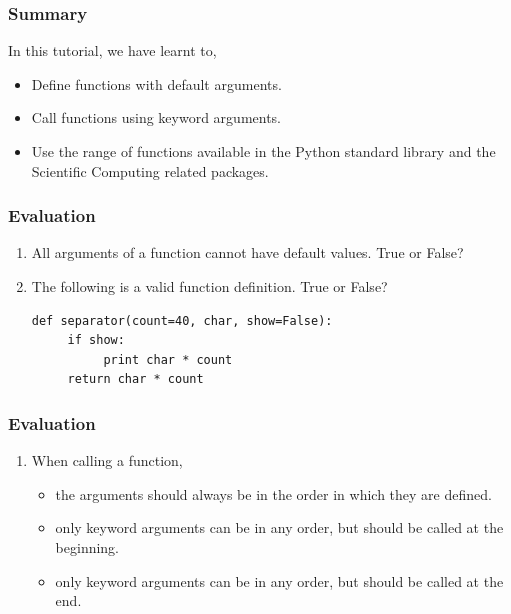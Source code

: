 \documentclass[17pt]{beamer}
\newcounter{saveenumi}
\newcommand{\seti}{\setcounter{saveenumi}{\value{enumi}}}
\newcommand{\conti}{\setcounter{enumi}{\value{saveenumi}}}
\begin{document}
\begin{frame}
\frametitle{Summary}
\label{sec-12}

 In this tutorial, we have learnt to, 

\begin{itemize}
\item Define functions with default arguments.\pause
\item Call functions using keyword arguments.\pause
\item Use the range of functions available in the Python standard library 
   and the Scientific Computing related packages.
\end{itemize}
\end{frame}

\begin{frame}[fragile]
\frametitle{Evaluation}
\label{sec-13.1}

\begin{enumerate}
\item All arguments of a function cannot have default values.
 True or False?\pause
\vspace{3pt} 
\item The following is a valid function definition. True or False? \pause
\lstset{language=Python}
\begin{footnotesize}
\begin{lstlisting}
def separator(count=40, char, show=False):
     if show:
          print char * count
     return char * count
\end{lstlisting}
\end{footnotesize}
\seti
\end{enumerate}
\end{frame}

\begin{frame}[fragile]
\frametitle{Evaluation}
\label{sec-13.2}

\begin{enumerate}
\conti
\item When calling a function,
\begin{itemize}
\item the arguments should always be in the order in which they are defined.\pause
\item only keyword arguments can be in any order, but should be called
     at the beginning.\pause
\item only keyword arguments can be in any order, but should be called at the end.
\end{itemize}
\end{enumerate}
\end{frame}
\end{document}
